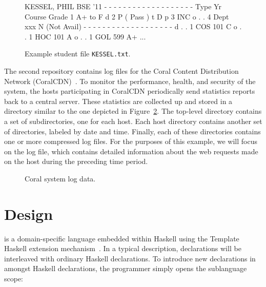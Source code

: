 \documentclass[nocopyrightspace,natbib]{sigplanconf}
\begin{document}
\begin{figure}
\begin{code}
KESSEL, PHIL	   BSE   '11
- - - - - - - - - - - - - - - - - - -
Type    Yr  Course     Grade
         1             A+ to F
d        2             P  (  Pass )
t  D  p  3             INC
o  .  .  4  Dept  xxx  N  (Not Avail)
- - - - - - - - - - - - - - - - - - -
d  .  .  1  COS   101  C
o  .  .  1  HOC   101  A
o  .  .  1  GOL   599  A+
...
\end{code}
\caption{Example student file {\tt KESSEL.txt}.}
\label{fig:student-file-example}
\end{figure}

The second repository contains log files for the Coral Content
Distribution Network
(CoralCDN)~\cite{freedman+:coral,freedman:coral-experience}. To
monitor the performance, health, and security of the system, the hosts
participating in CoralCDN periodically send statistics reports back to
a central server. These statistics are collected up and stored in a
directory similar to the one depicted in Figure~\ref{fig:coral-pic}.
The top-level  directory contains a set of subdirectories, one
for each host. Each host directory contains another set of
directories, labeled by date and time. Finally, each of these
directories contains one or more compressed log files. For the
purposes of this example, we will focus on the 
log file, which contains detailed information about the web requests
made on the host during the preceding time period.


\begin{figure}
\caption{Coral system log data.}
\label{fig:coral-pic}
\end{figure}

\section{\forest{} Design}
\label{sec:review}

\forest{} is a domain-specific language embedded within Haskell using the
Template Haskell extension mechanism~\cite{metahaskell}.  In a typical
\forest{} description, \forest{} declarations will be interleaved with ordinary
Haskell declarations.  To introduce new \forest{} declarations in amongst
Haskell declarations,
the programmer simply opens the \forest{} sublanguage scope:
\begin{code}
\end{code}
\end{document}
